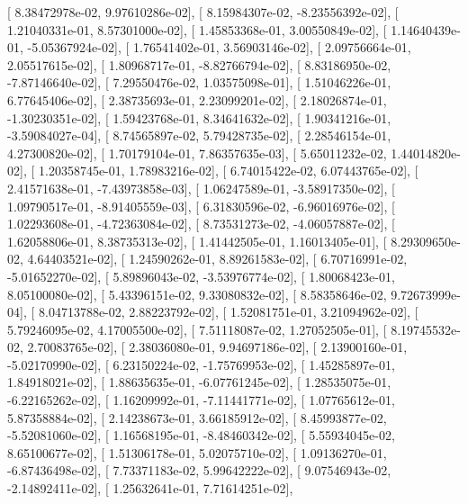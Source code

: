 \documentclass{article}
\begin{document}
       [  8.38472978e-02,   9.97610286e-02],
       [  8.15984307e-02,  -8.23556392e-02],
       [  1.21040331e-01,   8.57301000e-02],
       [  1.45853368e-01,   3.00550849e-02],
       [  1.14640439e-01,  -5.05367924e-02],
       [  1.76541402e-01,   3.56903146e-02],
       [  2.09756664e-01,   2.05517615e-02],
       [  1.80968717e-01,  -8.82766794e-02],
       [  8.83186950e-02,  -7.87146640e-02],
       [  7.29550476e-02,   1.03575098e-01],
       [  1.51046226e-01,   6.77645406e-02],
       [  2.38735693e-01,   2.23099201e-02],
       [  2.18026874e-01,  -1.30230351e-02],
       [  1.59423768e-01,   8.34641632e-02],
       [  1.90341216e-01,  -3.59084027e-04],
       [  8.74565897e-02,   5.79428735e-02],
       [  2.28546154e-01,   4.27300820e-02],
       [  1.70179104e-01,   7.86357635e-03],
       [  5.65011232e-02,   1.44014820e-02],
       [  1.20358745e-01,   1.78983216e-02],
       [  6.74015422e-02,   6.07443765e-02],
       [  2.41571638e-01,  -7.43973858e-03],
       [  1.06247589e-01,  -3.58917350e-02],
       [  1.09790517e-01,  -8.91405559e-03],
       [  6.31830596e-02,  -6.96016976e-02],
       [  1.02293608e-01,  -4.72363084e-02],
       [  8.73531273e-02,  -4.06057887e-02],
       [  1.62058806e-01,   8.38735313e-02],
       [  1.41442505e-01,   1.16013405e-01],
       [  8.29309650e-02,   4.64403521e-02],
       [  1.24590262e-01,   8.89261583e-02],
       [  6.70716991e-02,  -5.01652270e-02],
       [  5.89896043e-02,  -3.53976774e-02],
       [  1.80068423e-01,   8.05100080e-02],
       [  5.43396151e-02,   9.33080832e-02],
       [  8.58358646e-02,   9.72673999e-04],
       [  8.04713788e-02,   2.88223792e-02],
       [  1.52081751e-01,   3.21094962e-02],
       [  5.79246095e-02,   4.17005500e-02],
       [  7.51118087e-02,   1.27052505e-01],
       [  8.19745532e-02,   2.70083765e-02],
       [  2.38036080e-01,   9.94697186e-02],
       [  2.13900160e-01,  -5.02170990e-02],
       [  6.23150224e-02,  -1.75769953e-02],
       [  1.45285897e-01,   1.84918021e-02],
       [  1.88635635e-01,  -6.07761245e-02],
       [  1.28535075e-01,  -6.22165262e-02],
       [  1.16209992e-01,  -7.11441771e-02],
       [  1.07765612e-01,   5.87358884e-02],
       [  2.14238673e-01,   3.66185912e-02],
       [  8.45993877e-02,  -5.52081060e-02],
       [  1.16568195e-01,  -8.48460342e-02],
       [  5.55934045e-02,   8.65100677e-02],
       [  1.51306178e-01,   5.02075710e-02],
       [  1.09136270e-01,  -6.87436498e-02],
       [  7.73371183e-02,   5.99642222e-02],
       [  9.07546943e-02,  -2.14892411e-02],
       [  1.25632641e-01,   7.71614251e-02],
\end{document}
